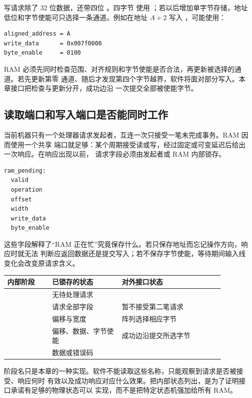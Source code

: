 写请求除了 32 位数据，还带四位 。四字节  使用
；若以后增加单字节存储，地址低位和字节使能可只选择一条通道。例如在地址
\(A+2\) 写入 ，可能使用：

\begin{lstlisting}
aligned_address = A
write_data      = 0x007f0000
byte_enable     = 0100
\end{lstlisting}

RAM 必须先同时检查范围、对齐规则和字节使能是否合法，再更新被选择的通道。若先更新第零
通道、随后才发现第四个字节越界，软件将面对部分写入。本章接口把检查与更新分开，成功边沿
一次提交全部被使能字节。

\subsection{读取端口和写入端口是否能同时工作}

当前机器只有一个处理器请求发起者，互连一次只接受一笔未完成事务。RAM 因而使用一个共享
端口就足够：某个周期接受读或写，经过固定或可变延迟后给出一次响应。在响应出现以前，
请求字段必须由发起者或 RAM 内部锁存。

\begin{lstlisting}
ram_pending:
  valid
  operation
  offset
  width
  write_data
  byte_enable
\end{lstlisting}

这些字段解释了“RAM 正在忙”究竟保存什么。若只保存地址而忘记操作方向，响应时就无法
判断应返回数据还是提交写入；若不保存字节使能，等待期间输入线变化会改变原请求含义。

\begin{longtable}{|L{0.18\linewidth}|L{0.29\linewidth}|L{0.41\linewidth}|}
\hline
{}
内部阶段 & 已锁存的状态 & 对外接口状态 \\ \hline
{} & 无待处理请求 &  \\ \hline
{} & 请求全部字段 & 暂不接受第二笔请求 \\ \hline
{} & 偏移与宽度 & 阵列选择相应字节 \\ \hline
{} & 偏移、数据、字节使能 & 成功边沿提交所选字节 \\ \hline
{} & 数据或错误码 &  \\ \hline
\end{longtable}

阶段名只是本章的一种实现。软件不能读取这些名称，只能观察到请求是否被接受、响应何时
有效以及成功响应对应什么效果。把内部状态列出，是为了证明接口承诺有足够的物理状态可以
实现，而不是把特定状态机强加给所有 RAM。

